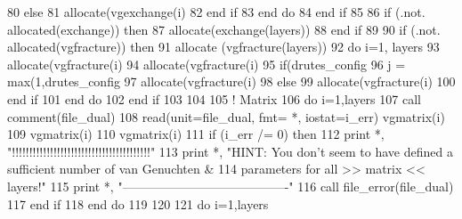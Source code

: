 \begin{DoxyCode}
80             \textcolor{keywordflow}{else}
81                 \textcolor{keyword}{allocate}(vgexchange(i)%
82 \textcolor{keywordflow}{            end if}                      
83 \textcolor{keywordflow}{        end do}
84 \textcolor{keywordflow}{      end if}
85       
86       \textcolor{keywordflow}{if} (.not. \textcolor{keyword}{allocated}(exchange)) \textcolor{keywordflow}{then}
87             \textcolor{keyword}{allocate}(exchange(layers))
88 \textcolor{keywordflow}{      end if}
89       
90       \textcolor{keywordflow}{if} (.not. \textcolor{keyword}{allocated}(vgfracture)) \textcolor{keywordflow}{then}
91         \textcolor{keyword}{allocate} (vgfracture(layers))
92         \textcolor{keywordflow}{do} i=1, layers
93             \textcolor{keyword}{allocate}(vgfracture(i)%
94             \textcolor{keyword}{allocate}(vgfracture(i)%
95             \textcolor{keywordflow}{if}(drutes_config%
96                 j = max(1,drutes_config%
97                 \textcolor{keyword}{allocate}(vgfracture(i)%
98             \textcolor{keywordflow}{else}
99                 \textcolor{keyword}{allocate}(vgfracture(i)%
100 \textcolor{keywordflow}{            end if}                      
101 \textcolor{keywordflow}{        end do}
102 \textcolor{keywordflow}{      end if}
103       
104      
105       \textcolor{comment}{! Matrix}
106       \textcolor{keywordflow}{do} i=1,layers
107         \textcolor{keyword}{call }comment(file\_dual)
108         \textcolor{keyword}{read}(unit=file\_dual, fmt= *, iostat=i\_err) vgmatrix(i)%
109                             vgmatrix(i)%
110         vgmatrix(i)%
111         \textcolor{keywordflow}{if} (i\_err /= 0) \textcolor{keywordflow}{then}
112           print *, \textcolor{stringliteral}{"!!!!!!!!!!!!!!!!!!!!!!!!!!!!!!!!!!!!!!!!"}
113           print *, \textcolor{stringliteral}{"HINT: You don't seem to have defined a sufficient number of van Genuchten &}
114 \textcolor{stringliteral}{}\textcolor{stringliteral}{           parameters for all >> matrix << layers!"}
115           print *, \textcolor{stringliteral}{"----------------------------------------"}
116           \textcolor{keyword}{call }file_error(file\_dual)
117 \textcolor{keywordflow}{        end if}
118 \textcolor{keywordflow}{      end do}
119       
120     
121       \textcolor{keywordflow}{do} i=1,layers

\end{DoxyCode}
